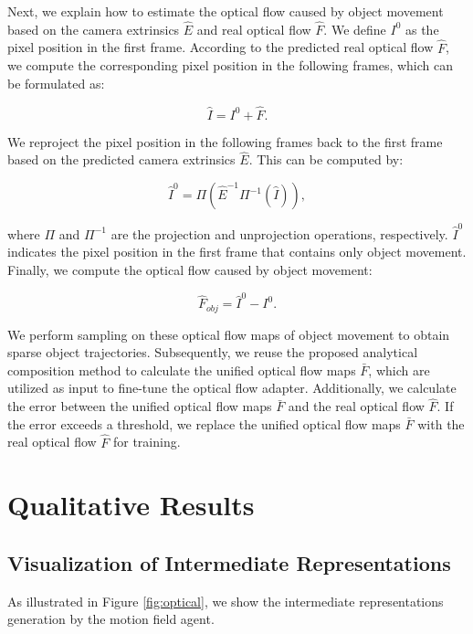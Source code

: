Next, we explain how to estimate the optical flow caused by object movement based on the camera extrinsics $\hat{E}$ and real optical flow $\hat{F}$. We define $I^{0}$ as the pixel position in the first frame. According to the predicted real optical flow $\hat{F}$, we compute the corresponding pixel position in the following frames, which can be formulated as:

\begin{equation} 
    \hat{I} = I^{0} + \hat{F}. 
\end{equation}

We reproject the pixel position in the following frames back to the first frame based on the predicted camera extrinsics $\hat{E}$. This can be computed by:

\begin{equation} 
    \hat{I}^{0} = \Pi(\hat{E}^{-1}\Pi^{-1}(\hat{I})), 
\end{equation}

where $\Pi$ and $\Pi^{-1}$ are the projection and unprojection operations, respectively. $\hat{I}^{0}$ indicates the pixel position in the first frame that contains only object movement. Finally, we compute the optical flow caused by object movement:

\begin{equation} 
    \hat{F}_{obj} = \hat{I}^{0} - I^{0}. 
\end{equation}

 We perform sampling \cite{zhan2019self} on these optical flow maps of object movement to obtain sparse object trajectories. Subsequently, we reuse the proposed analytical composition method to calculate the unified optical flow maps $\bar{F}$, which are utilized as input to fine-tune the optical flow adapter. Additionally, we calculate the error between the unified optical flow maps $\bar{F}$ and the real optical flow $\hat{F}$. If the error exceeds a threshold, we replace the unified optical flow maps $\bar{F}$ with the real optical flow $\hat{F}$ for training.

\section{Qualitative Results}

\subsection{Visualization of Intermediate Representations}

As illustrated in Figure \ref{fig:optical}, we show the intermediate representations generation by the motion field agent.


